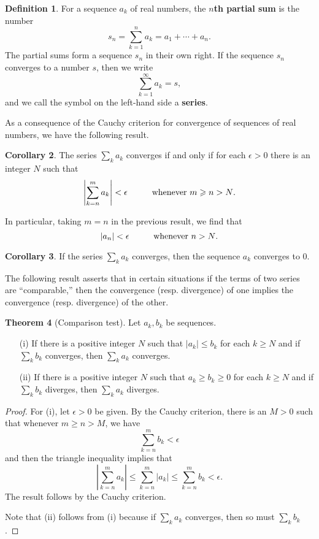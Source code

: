 \documentclass[12pt]{article}
\theoremstyle{definition}
\newtheorem{definition}{Definition}
\theoremstyle{theorem}
\newtheorem{theorem}[definition]{Theorem}
\newtheorem{corollary}[definition]{Corollary}
\begin{document}
\begin{definition}
For a sequence $a_k$ of real numbers, the \textbf{$n$th partial sum} is the number 
\[
s_n = \sum_{k=1}^n a_k = a_1 + \cdots + a_n.
\]
The partial sums form a sequence $s_n$ in their own right. If the sequence $s_n$ converges to a number $s$, then we write 
\[
\sum_{k=1}^\infty a_k = s,
\]
and we call the symbol on the left-hand side a \textbf{series}. 
\end{definition} 

As a consequence of the Cauchy criterion for convergence of sequences of real numbers, we have the following result. 

\begin{corollary}
The series $\sum_k a_k$ converges if and only if for each $\epsilon > 0$ there is an integer $N$ such that  
\[
\left|\sum_{k=n}^m a_k\right| < \epsilon  \hspace{10mm} \text{whenever $m\geqslant n > N$}.
\]
\end{corollary}

In particular, taking $m = n$ in the previous result, we find that 
\[
|a_n| < \epsilon \hspace{10mm} \text{whenever $n > N$}. 
\]

\begin{corollary}
If the series $\sum_k a_k$ converges, then the sequence $a_k$ converges to $0$. 
\end{corollary}

The following result asserts that in certain situations if the terms of two series are ``comparable,'' then the convergence (resp. divergence) of one implies the convergence (resp. divergence) of the other.   

\begin{theorem}[Comparison test]
Let $a_k, b_k$ be sequences. 
\begin{enumerate}
\item[(i)] If there is a positive integer $N$ such that $|a_k| \leqslant b_k$ for each $k \geqslant N$ and if $\sum_k b_k$ converges, then $\sum_k a_k$ converges. 
\item[(ii)] If there is a positive integer $N$ such that $a_k \geqslant b_k \geqslant 0$ for each $k \geqslant N$ and if $\sum_k b_k$ diverges, then $\sum_k a_k$ diverges. 
\end{enumerate}
\end{theorem}

\begin{proof}
For (i), let $\epsilon > 0$ be given. By the Cauchy criterion, there is an $M > 0$ such that whenever $m \geqslant n > M$, we have 
\[
\sum_{k=n}^m b_k  < \epsilon
\]
and then the triangle inequality implies that 
\[
\left|\sum_{k=n}^m a_k\right| \leqslant \sum_{k=n}^m |a_k| \leqslant \sum_{k=n}^m b_k < \epsilon.
\]
The result follows by the Cauchy criterion. 

Note that (ii) follows from (i) because if $\sum_k a_k$ converges, then so must $\sum_k b_k$. 
\end{proof}
\end{document}
